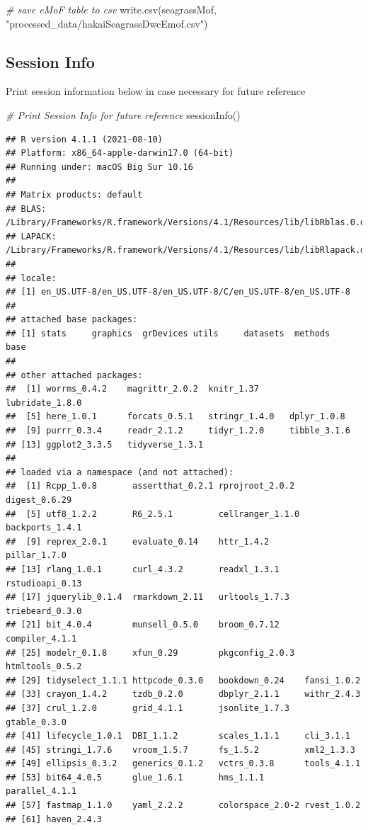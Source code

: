 \documentclass[
]{book}
\newenvironment{Shaded}{\begin{snugshade}}{\end{snugshade}}
\newcommand{\CommentTok}[1]{\textcolor[rgb]{0.56,0.35,0.01}{\textit{#1}}}
\newcommand{\FunctionTok}[1]{\textcolor[rgb]{0.00,0.00,0.00}{#1}}
\newcommand{\NormalTok}[1]{#1}
\newcommand{\StringTok}[1]{\textcolor[rgb]{0.31,0.60,0.02}{#1}}
\begin{document}
\begin{Shaded}
\begin{Highlighting}[]
\CommentTok{\# save eMoF table to csv}
\FunctionTok{write.csv}\NormalTok{(seagrassMof, }\StringTok{"processed\_data/hakaiSeagrassDwcEmof.csv"}\NormalTok{)}
\end{Highlighting}
\end{Shaded}

\hypertarget{session-info}{%
\subsection{Session Info}\label{session-info}}

Print session information below in case necessary for future reference

\begin{Shaded}
\begin{Highlighting}[]
\CommentTok{\# Print Session Info for future reference}
\FunctionTok{sessionInfo}\NormalTok{()}
\end{Highlighting}
\end{Shaded}

\begin{verbatim}
## R version 4.1.1 (2021-08-10)
## Platform: x86_64-apple-darwin17.0 (64-bit)
## Running under: macOS Big Sur 10.16
## 
## Matrix products: default
## BLAS:   /Library/Frameworks/R.framework/Versions/4.1/Resources/lib/libRblas.0.dylib
## LAPACK: /Library/Frameworks/R.framework/Versions/4.1/Resources/lib/libRlapack.dylib
## 
## locale:
## [1] en_US.UTF-8/en_US.UTF-8/en_US.UTF-8/C/en_US.UTF-8/en_US.UTF-8
## 
## attached base packages:
## [1] stats     graphics  grDevices utils     datasets  methods   base     
## 
## other attached packages:
##  [1] worrms_0.4.2    magrittr_2.0.2  knitr_1.37      lubridate_1.8.0
##  [5] here_1.0.1      forcats_0.5.1   stringr_1.4.0   dplyr_1.0.8    
##  [9] purrr_0.3.4     readr_2.1.2     tidyr_1.2.0     tibble_3.1.6   
## [13] ggplot2_3.3.5   tidyverse_1.3.1
## 
## loaded via a namespace (and not attached):
##  [1] Rcpp_1.0.8       assertthat_0.2.1 rprojroot_2.0.2  digest_0.6.29   
##  [5] utf8_1.2.2       R6_2.5.1         cellranger_1.1.0 backports_1.4.1 
##  [9] reprex_2.0.1     evaluate_0.14    httr_1.4.2       pillar_1.7.0    
## [13] rlang_1.0.1      curl_4.3.2       readxl_1.3.1     rstudioapi_0.13 
## [17] jquerylib_0.1.4  rmarkdown_2.11   urltools_1.7.3   triebeard_0.3.0 
## [21] bit_4.0.4        munsell_0.5.0    broom_0.7.12     compiler_4.1.1  
## [25] modelr_0.1.8     xfun_0.29        pkgconfig_2.0.3  htmltools_0.5.2 
## [29] tidyselect_1.1.1 httpcode_0.3.0   bookdown_0.24    fansi_1.0.2     
## [33] crayon_1.4.2     tzdb_0.2.0       dbplyr_2.1.1     withr_2.4.3     
## [37] crul_1.2.0       grid_4.1.1       jsonlite_1.7.3   gtable_0.3.0    
## [41] lifecycle_1.0.1  DBI_1.1.2        scales_1.1.1     cli_3.1.1       
## [45] stringi_1.7.6    vroom_1.5.7      fs_1.5.2         xml2_1.3.3      
## [49] ellipsis_0.3.2   generics_0.1.2   vctrs_0.3.8      tools_4.1.1     
## [53] bit64_4.0.5      glue_1.6.1       hms_1.1.1        parallel_4.1.1  
## [57] fastmap_1.1.0    yaml_2.2.2       colorspace_2.0-2 rvest_1.0.2     
## [61] haven_2.4.3
\end{verbatim}
\end{document}
